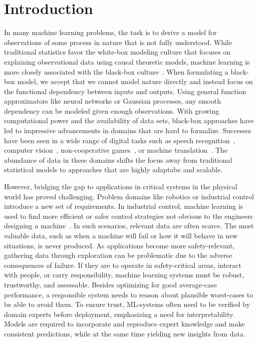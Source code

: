 \chapter{Introduction}
\label{toc:introduction}
In many machine learning problems, the task is to derive a model for observations of some process in nature that is not fully understood.
While traditional statistics favor the white-box modeling culture that focuses on explaining observational data using causal theoretic models, machine learning is more closely associated with the black-box culture~\parencite{breiman_statistical_2001,shmueli_explain_2010}.
When formulating a black-box model, we accept that we cannot model nature directly and instead focus on the functional dependency between inputs and outputs.
Using general function approximators like neural networks or Gaussian processes, any smooth dependency can be modeled given enough observations.
With growing computational power and the availability of data sets, black-box approaches have led to impressive advancements in domains that are hard to formalize.
Successes have been seen in a wide range of digital tasks such as speech recognition~\parencite{hochreiter_long_1997,chorowski_attention-based_2015,bahdanau_neural_2014,chorowski_attention-based_2015}, computer vision~\parencite{russakovsky_imagenet_2015,lecun_backpropagation_1989}, non-cooperative games~\parencite{berner_dota_2019,silver_mastering_2016}, or machine translation~\parencite{johnson_googles_2017}.
The abundance of data in these domains shifts the focus away from traditional statistical models to approaches that are highly adaptabe and scalable.

However, bridging the gap to applications in critical systems in the physical world has proved challenging.
Problem domains like robotics or industrial control introduce a new set of requirements.
In industrial control, machine learning is used to find more efficient or safer control strategies not obvious to the engineers designing a machine~\parencite{hein_benchmark_2017}.
In such scenarios, relevant data are often scarce.
The most valuable data, such as when a machine will fail or how it will behave in new situations, is never produced.
As applications become more safety-relevant, gathering data through exploration can be problematic due to the adverse consequences of failure.
If they are to operate in safety-critical areas, interact with people, or carry responsibility, machine learning systems must be robust, trustworthy, and assessable.
Besides optimizing for good average-case performance, a responsible system needs to reason about plausible worst-cases to be able to avoid them.
To ensure trust, ML-systems often need to be verified by domain experts before deployment, emphasizing a need for interpretability.
Models are required to incorporate and reproduce expert knowledge and make consistent predictions, while at the same time yielding new insights from data.


